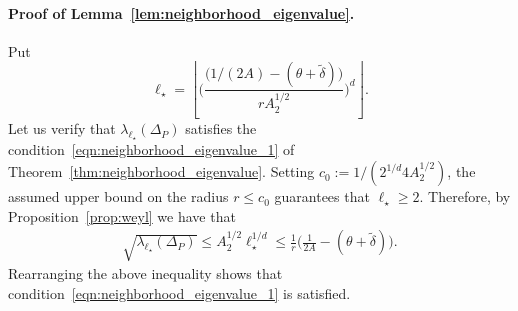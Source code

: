 \documentclass[twoside]{article}
\newcommand{\floor}[1]{\left\lfloor #1 \right\rfloor}
\newcommand{\1}{\mathbf{1}}
\newcommand{\wt}[1]{\widetilde{#1}}
\theoremstyle{definition}
\theoremstyle{remark}
\begin{document}
\paragraph{Proof of Lemma~\ref{lem:neighborhood_eigenvalue}.}
Put
\begin{equation*}
\ell_{\star} = \floor{\biggl(\frac{\bigl(1/(2A) - (\theta + \wt{\delta})\bigr)}{rA_2^{1/2}}\biggr)^d}.
\end{equation*}
Let us verify that $\lambda_{\ell_{\star}}(\Delta_P)$ satisfies the condition~\ref{eqn:neighborhood_eigenvalue_1} of Theorem~\ref{thm:neighborhood_eigenvalue}. Setting $c_0 := 1/(2^{1/d}4A_2^{1/2})$, the assumed upper bound on the radius $r \leq c_0$ guarantees that $\ell_{\star} \geq 2$. Therefore, by Proposition~\ref{prop:weyl} we have that
\begin{align*}
\sqrt{\lambda_{\ell_{\star}}(\Delta_P)} \leq A_2^{1/2}\ell_{\star}^{1/d} \leq  \frac{1}{r}\biggl(\frac{1}{2A} - (\theta + \wt{\delta})\biggr).
\end{align*}
Rearranging the above inequality shows that condition~\eqref{eqn:neighborhood_eigenvalue_1} is satisfied. 
\end{document}
